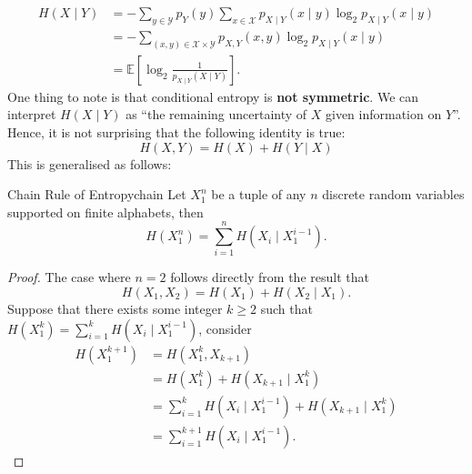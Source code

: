 \documentclass[math]{amznotes}
\theoremstyle{remark}
\begin{document}
\begin{align*}
    H\left(X \mid Y\right) & = -\sum_{y \in \mathcal{Y}}p_Y\left(y\right)\sum_{x \in \mathcal{X}}p_{X \mid Y}\left(x \mid y\right)\log_2p_{X \mid Y}\left(x \mid y\right) \\
    & = -\sum_{\left(x, y\right) \in \mathcal{X \times Y}}p_{X, Y}\left(x, y\right)\log_2p_{X \mid Y}\left(x \mid y\right) \\
    & = \mathbb{E}\left[\log_2\frac{1}{p_{X \mid Y}\left(X \mid Y\right)}\right].
\end{align*}
One thing to note is that conditional entropy is \textbf{not symmetric}. We can interpret $H\left(X \mid Y\right)$ as ``the remaining uncertainty of $X$ given information on $Y$''. Hence, it is not surprising that the following identity is true:
\begin{equation*}
    H\left(X, Y\right) = H\left(X\right) + H\left(Y \mid X\right)
\end{equation*}
This is generalised as follows:
\begin{probox}{Chain Rule of Entropy}{chain}
    Let $X_1^n$ be a tuple of any $n$ discrete random variables supported on finite alphabets, then 
    \begin{equation*}
        H\left(X_1^n\right) = \sum_{i = 1}^{n}H\left(X_i \mid X_1^{i - 1}\right).
    \end{equation*}
    \tcblower
    \begin{proof}
        The case where $n = 2$ follows directly from the result that 
        \begin{equation*}
            H\left(X_1, X_2\right) = H\left(X_1\right) + H\left(X_2 \mid X_1\right).
        \end{equation*}
        Suppose that there exists some integer $k \geq 2$ such that $H\left(X_1^k\right) = \sum_{i = 1}^{k}H\left(X_i \mid X_1^{i - 1}\right)$, consider
        \begin{align*}
            H\left(X_1^{k + 1}\right) & = H\left(X_1^k, X_{k + 1}\right) \\
            & = H\left(X_1^k\right) + H\left(X_{k + 1} \mid X_1^k\right) \\
            & = \sum_{i = 1}^{k}H\left(X_i \mid X_1^{i - 1}\right) + H\left(X_{k + 1} \mid X_1^k\right) \\
            & = \sum_{i = 1}^{k + 1}H\left(X_i \mid X_1^{i - 1}\right).
        \end{align*}
    \end{proof}
\end{probox}
\end{document}
